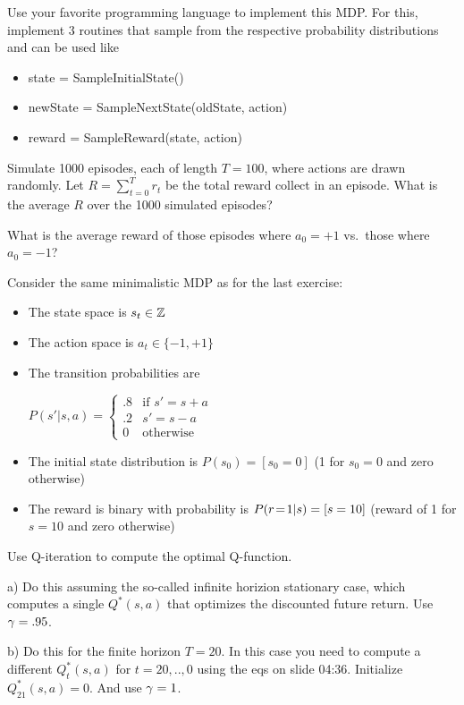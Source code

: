 Use your favorite programming language to implement this MDP. For
this, implement 3 routines that sample from the respective probability
distributions and can be used like
\begin{itemize}
\item state = SampleInitialState()
\item newState = SampleNextState(oldState, action)
\item reward = SampleReward(state, action)
\end{itemize}

Simulate 1000 episodes, each of length $T=100$, where actions are
drawn randomly. Let $R = \sum_{t=0}^T r_t$ be the total reward collect
in an episode. What is the average $R$ over the 1000 simulated
episodes?

What is the average reward of those episodes where $a_0 = +1$ vs.\
 those where $a_0=-1$?



Consider the same minimalistic MDP as for the last exercise:
\begin{itemize}
\item The state space is $s_t \in \ZZZ$
\item The action space is $a_t \in\{-1, +1\}$
\item The transition probabilities are

$P(s'|s,a) = \begin{cases} .8
& \text{if~} s'=s+a \\ .2 & s'=s-a \\ 0
& \text{otherwise}\end{cases}$
\item The initial state distribution is $P(s_0) = [s_0=0]$ (1 for $s_0=0$ and
zero otherwise)
\item The reward is binary with probability is $P(r\=1|s) = [s=10]$
(reward of 1 for $s=10$ and zero otherwise)
\end{itemize}

Use Q-iteration to compute the optimal Q-function.

a) Do this assuming the so-called infinite horizion stationary case,
which computes a single $Q^*(s,a)$ that optimizes the discounted
future return. Use $\g=.95$.

b) Do this for the finite horizon $T=20$. In this case you need to
compute a different $Q_t^*(s,a)$ for $t=20,..,0$ using the eqs on
slide 04:36. Initialize $Q^*_{21}(s,a)=0$. And use $\g=1$.

